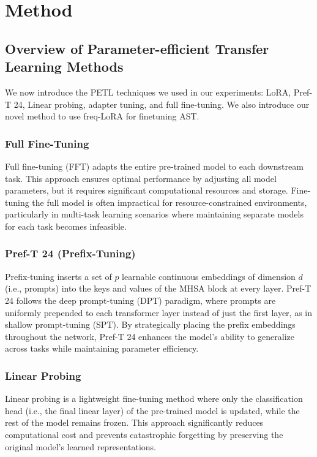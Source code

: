 \documentclass[11pt]{article}
\begin{document}
\section{Method}
\subsection{Overview of Parameter-efficient Transfer Learning Methods}

We now introduce the PETL techniques we used in our experiments: LoRA, Pref-T 24, Linear probing, adapter tuning, and full fine-tuning.
We also introduce our novel method to use freq-LoRA for finetuning AST.

\subsubsection{Full Fine-Tuning}
Full fine-tuning (FFT) adapts the entire pre-trained model to each downstream task. This approach ensures optimal performance by adjusting all model parameters, but it requires significant computational resources and storage. Fine-tuning the full model is often impractical for resource-constrained environments, particularly in multi-task learning scenarios where maintaining separate models for each task becomes infeasible.

\subsubsection{Pref-T 24 (Prefix-Tuning)}
Prefix-tuning inserts a set of $p$ learnable continuous embeddings of dimension $d$ (i.e., prompts) into the keys and values of the MHSA block at every layer. Pref-T 24 follows the deep prompt-tuning (DPT) paradigm, where prompts are uniformly prepended to each transformer layer instead of just the first layer, as in shallow prompt-tuning (SPT). By strategically placing the prefix embeddings throughout the network, Pref-T 24 enhances the model’s ability to generalize across tasks while maintaining parameter efficiency.

\subsubsection{Linear Probing}
Linear probing is a lightweight fine-tuning method where only the classification head (i.e., the final linear layer) of the pre-trained model is updated, while the rest of the model remains frozen. This approach significantly reduces computational cost and prevents catastrophic forgetting by preserving the original model’s learned representations.
\end{document}
